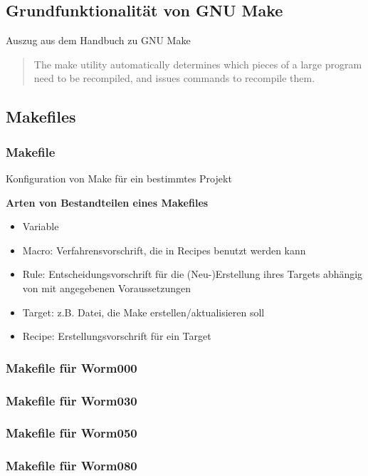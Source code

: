 \subsection{Grundfunktionalität von GNU Make}
\begin{frame}
\cite{GNU_Make_manual} Auszug aus dem Handbuch zu GNU Make
\begin{quote}
The make utility automatically determines which pieces of a large program need to be recompiled, and issues commands to recompile them.
\end{quote}
\end{frame}

\subsection{Makefiles}
\begin{frame}
\frametitle{Makefile} Konfiguration von Make für ein bestimmtes Projekt

\textbf{Arten von Bestandteilen eines Makefiles}
\begin{itemize}
	\item Variable
	\item Macro: Verfahrensvorschrift, die in Recipes benutzt werden kann
	\item Rule: Entscheidungsvorschrift für die (Neu-)Erstellung ihres Targets abhängig von mit angegebenen Voraussetzungen
	\item Target: z.B. Datei, die Make erstellen/aktualisieren soll
	\item Recipe: Erstellungsvorschrift für ein Target
\end{itemize}
\end{frame}

\begin{frame}[allowframebreaks]
	\frametitle{Makefile für Worm000}
\end{frame}

\begin{frame}[allowframebreaks]
	\frametitle{Makefile für Worm030}
\end{frame}

\begin{frame}[allowframebreaks]
	\frametitle{Makefile für Worm050}
\end{frame}

\begin{frame}[allowframebreaks]
	\frametitle{Makefile für Worm080}
\end{frame}


